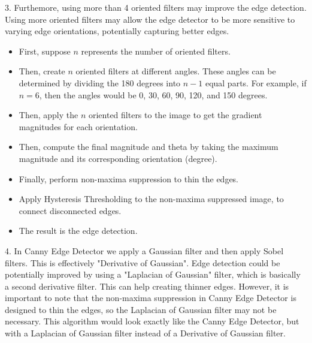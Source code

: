 \documentclass[12pt]{article}
\begin{document}
3. Furthemore, using more than 4 oriented filters may improve the edge detection. Using more oriented filters may allow the edge detector to be more sensitive to varying edge orientations, potentially capturing better edges.
\begin{itemize}
    \item First, suppose $n$ represents the number of oriented filters.
    \item Then, create $n$ oriented filters at different angles. These angles can be determined by dividing the 180 degrees into $n-1$ equal parts. For example, if $n=6$, then the angles would be 0, 30, 60, 90, 120, and 150 degrees.
    \item Then, apply the $n$ oriented filters to the image to get the gradient magnitudes for each orientation.
    \item Then, compute the final magnitude and theta by taking the maximum magnitude and its corresponding orientation (degree).
    \item Finally, perform non-maxima suppression to thin the edges.
    \item Apply Hysteresis Thresholding to the non-maxima suppressed image, to connect disconnected edges.
    \item The result is the edge detection.
\end{itemize}
    
4. In Canny Edge Detector we apply a Gaussian filter and then apply Sobel filters. This is effectively "Derivative of Gaussian". Edge detection could be potentially improved by using a "Laplacian of Gaussian" filter, which is basically a second derivative filter. This can help creating thinner edges. However, it is important to note that the non-maxima suppression in Canny Edge Detector is designed to thin the edges, so the Laplacian of Gaussian filter may not be necessary. This algorithm would look exactly like the Canny Edge Detector, but with a Laplacian of Gaussian filter instead of a Derivative of Gaussian filter.
\end{document}
